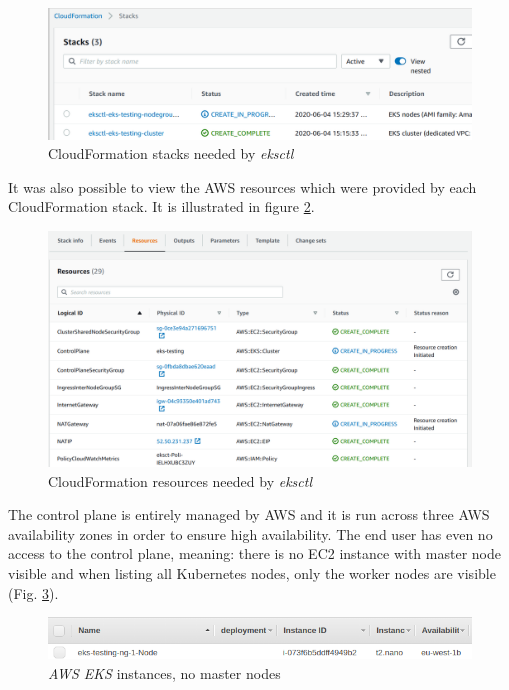 \begin{figure}[H]
    \centering
    \includegraphics[width=16cm]{figures/eks-cf-stacks-small.png}
    \captionsetup{justification=centering,margin=2cm}
    \caption{CloudFormation stacks needed by \textit{eksctl}}
    \label{eks-cf-stacks}
\end{figure}

It was also possible to view the AWS resources which were provided by each CloudFormation stack. It is illustrated in figure \ref{eks-cf-resources}.
\begin{figure}[H]
    \centering
    \includegraphics[width=16cm]{figures/eks-cf-resources.png}
    \captionsetup{justification=centering,margin=2cm}
    \caption{CloudFormation resources needed by \textit{eksctl}}
    \label{eks-cf-resources}
\end{figure}

The control plane is entirely managed by AWS and it is run across three AWS availability zones in order to ensure high availability. The end user has even no access to the control plane, meaning: there is no EC2 instance with master node visible and when listing all Kubernetes nodes, only the worker nodes are visible (Fig. \ref{eks-on-aws-node}).
\begin{figure}[H]
    \centering
    \includegraphics[width=16cm]{figures/eks-on-aws-node-small.png}
    \captionsetup{justification=centering,margin=2cm}
    \caption{\textit{AWS EKS} instances, no master nodes}
    \label{eks-on-aws-node}
\end{figure}

